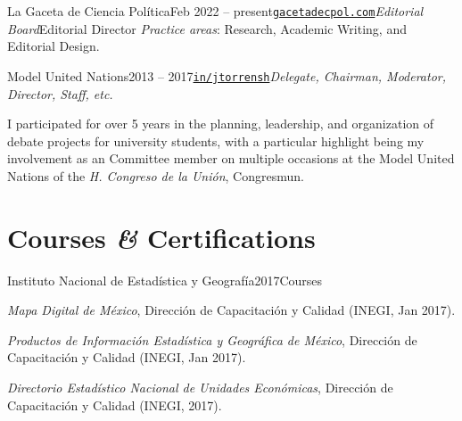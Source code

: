 \documentclass[letter]{resume}
\begin{document}
\begin{content}
\begin{position}{La Gaceta de Ciencia Política}{Feb 2022 -- present}{\normalfont\href{https://gacetadecpol.com/}{\texttt{gacetadecpol.com}}}{\emph{Editorial Board}}{Editorial Director}
  {\emph{Practice areas}}: Research, Academic Writing, and Editorial Design.
\end{position}

\begin{position}{Model United Nations}{2013 -- 2017}{\normalfont\href{https://www.linkedin.com/in/jtorrensh/}{\texttt{in/jtorrensh}}}{\emph{Delegate, Chairman, Moderator, Director, Staff, etc.}}{}
  \item I participated for over 5 years in the planning, leadership, and organization of debate projects for university students, with a particular highlight being my involvement as an Committee member on multiple occasions at the Model United Nations of the \emph{H. Congreso de la Unión}, Congresmun. 

\end{position}

\sectionlineskip
\end{content}


\section{Courses \textbf{\em\&} Certifications} 

\begin{content}
\begin{position}{Instituto Nacional de Estadística y Geografía}{2017}{Courses}{}{}
\item \emph{Mapa Digital de México}, Dirección de Capacitación y Calidad (INEGI, Jan 2017).
\item \emph{Productos de Información Estadística y Geográfica de México}, Dirección de Capacitación y Calidad (INEGI, Jan 2017).
\item \emph{Directorio Estadístico Nacional de Unidades Económicas}, Dirección de Capacitación y Calidad (INEGI, 2017).
\end{position}
\end{content}
\end{document}
